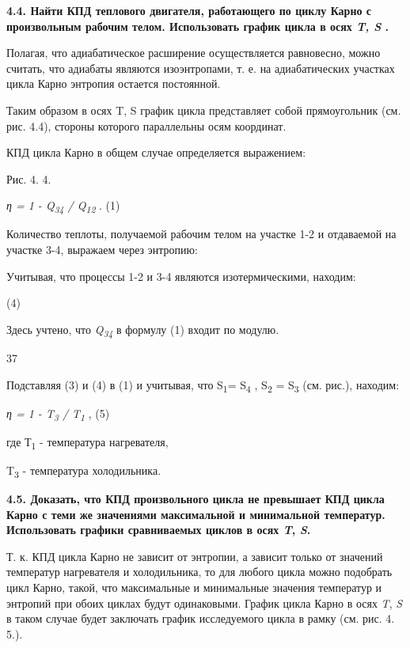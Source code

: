 \textbf{4.4. Найти КПД теплового двигателя, работающего по циклу Карно с
произвольным рабочим телом. Использовать график цикла в осях \emph{T, S}
.}

\solving{}

Полагая, что адиабатическое расширение осуществляется равновесно, можно
считать, что адиабаты являются изоэнтропами, т. е. на адиабатических
участках цикла Карно энтропия остается постоянной.

Таким образом в осях T, S график цикла представляет собой прямоугольник
(см. рис. 4.4), стороны которого параллельны осям координат.

КПД цикла Карно в общем случае определяется выражением:

Рис. 4. 4.

\emph{η = 1 - Q\textsubscript{34} / Q\textsubscript{12}} . (1)

Количество теплоты, получаемой рабочим телом на участке 1-2 и отдаваемой
на участке 3-4, выражаем через энтропию:


Учитывая, что процессы 1-2 и 3-4 являются изотермическими, находим:


(4)

Здесь учтено, что \emph{Q\textsubscript{34}} в формулу (1) входит по
модулю.

37

Подставляя (3) и (4) в (1) и учитывая, что S\textsubscript{1}=
S\textsubscript{4} , S\textsubscript{2} = S\textsubscript{3} (см. рис.),
находим:

\emph{η = 1 - T\textsubscript{3} / T\textsubscript{1}} , (5)

где Т\textsubscript{1} - температура нагревателя,

T\textsubscript{3} - температура холодильника.

\textbf{4.5. Доказать, что КПД произвольного цикла не превышает КПД
цикла Карно с теми же значениями максимальной и минимальной температур.
Использовать графики сравниваемых циклов в осях \emph{T}, \emph{S}.}

\solving{}

Т. к. КПД цикла Карно не зависит от энтропии, а зависит только от
значений температур нагревателя и холодильника, то для любого цикла
можно подобрать цикл Карно, такой, что максимальные и минимальные
значения температур и энтропий при обоих циклах будут одинаковыми.
График цикла Карно в осях \emph{T}, \emph{S} в таком случае будет
заключать график исследуемого цикла в рамку (см. рис. 4. 5.).

